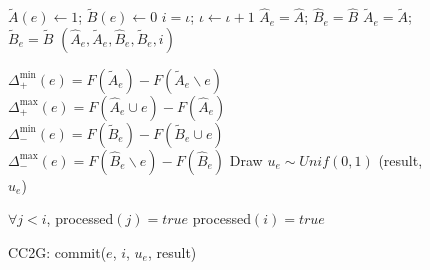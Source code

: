 \documentclass{article} %
\newcommand{\occ}{CC2G}
\begin{document}
\begin{figure}[h]
\begin{multicols}{2}
\begin{minipage}{0.49\textwidth}
    \end{minipage}

    \begin{minipage}{0.49\textwidth}
      \begin{algorithm}[H]
        \DontPrintSemicolon
        \caption{\occ{} getSnapshot($e$)}
        \label{alg:occsnapshot}
        $\tilde{A}(e) \leftarrow 1$;
        $\tilde{B}(e) \leftarrow 0$\;
        $i = \iota$;
        $\iota \leftarrow \iota + 1$\;\label{alg:occ:time}
        $\hat{A}_e = \hat{A}$;
        $\hat{B}_e = \hat{B}$\;
        $\tilde{A}_e = \tilde{A}$;
        $\tilde{B}_e = \tilde{B}$\;
        \Return $(\hat{A}_e, \tilde{A}_e, \hat{B}_e, \tilde{B}_e, i)$
      \end{algorithm}

      \begin{algorithm}[H]
        \DontPrintSemicolon
        \caption{\occ{} propose}
        \label{alg:propose}
        $\Delta_+^{\min}(e) = F(\tilde{A}_e) - F(\tilde{A}_e \backslash e)$\;\label{alg:occ:deltaplusmin}
        $\Delta_+^{\max}(e) = F(\hat{A}_e   \cup e) - F(\hat{A}_e)$\;\label{alg:occ:deltaplusmax}
        $\Delta_-^{\min}(e) = F(\tilde{B}_e) - F(\tilde{B}_e \cup e)$\;\label{alg:occ:deltaminusmin}
        $\Delta_-^{\max}(e) = F(\hat{B}_e   \backslash e) - F(\hat{B}_e)$\;\label{alg:occ:deltaminusmax}
        Draw $u_e \sim Unif(0,1)$\;
        \Return (result, $u_e$)
      \end{algorithm}

      \begin{algorithm}[H]
        \DontPrintSemicolon
        \caption{\occ{}: commit($e$, $i$, $u_e$, result)}
        \label{alg:occcommit}
        \WaitUntil $\forall j < i$, processed$(j) = true$\;
        processed$(i) = true$\;
      \end{algorithm}



\end{minipage}
\end{multicols}
\end{figure}
\end{document}
